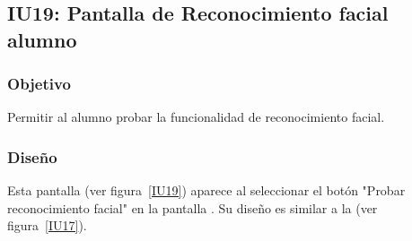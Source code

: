\subsection{IU19: Pantalla de Reconocimiento facial alumno}

\newpage	

\subsubsection{Objetivo}
Permitir al alumno probar la funcionalidad de reconocimiento facial.

\subsubsection{Diseño}
Esta pantalla  (ver figura~\ref{IU19}) aparece al seleccionar el botón "Probar reconocimiento facial" en la pantalla . Su diseño es similar a la  (ver figura~\ref{IU17}).



